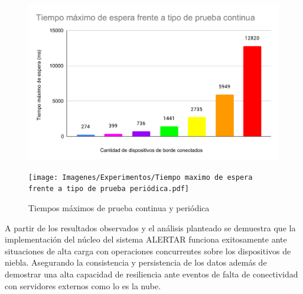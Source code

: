 \begin{figure}
    \centering
    \begin{minipage}{.8\textwidth}
        \centering
        \includegraphics[width=\textwidth]{Imagenes/Experimentos/Tiempo maximo de espera frente a tipo de prueba continua.pdf}
    \end{minipage}%
    \hfill
    \begin{minipage}{.8\textwidth}
        \centering
        \texttt{[image: Imagenes/Experimentos/Tiempo maximo de espera frente a tipo de prueba periódica.pdf]}
    \end{minipage}%
   
    \caption{Tiempos máximos de prueba continua y periódica}
    \label{fig:tiemposMaximosPruebas}
\end{figure}

A partir de los resultados observados y el análisis planteado se demuestra que la implementación del núcleo del sistema ALERTAR funciona exitosamente ante situaciones de alta carga con operaciones concurrentes sobre los dispositivos de niebla. Asegurando la consistencia y persistencia de los datos además de demostrar una alta capacidad de resiliencia ante eventos de falta de conectividad con servidores externos como lo es la nube.